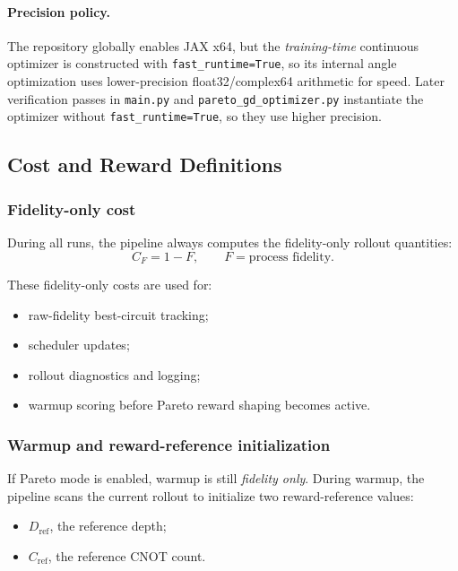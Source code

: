 \documentclass[11pt]{article}
\begin{document}
\paragraph{Precision policy.}
The repository globally enables JAX x64, but the \emph{training-time} continuous optimizer is constructed with \texttt{fast\_runtime=True}, so its internal angle optimization uses lower-precision float32/complex64 arithmetic for speed.
Later verification passes in \texttt{main.py} and \texttt{pareto\_gd\_optimizer.py} instantiate the optimizer without \texttt{fast\_runtime=True}, so they use higher precision.

\subsection{Cost and Reward Definitions}

\subsubsection{Fidelity-only cost}

During all runs, the pipeline always computes the fidelity-only rollout quantities:
\[
C_F = 1-F, \qquad F = \text{process fidelity}.
\]

These fidelity-only costs are used for:
\begin{itemize}[leftmargin=*]
\item raw-fidelity best-circuit tracking;
\item scheduler updates;
\item rollout diagnostics and logging;
\item warmup scoring before Pareto reward shaping becomes active.
\end{itemize}

\subsubsection{Warmup and reward-reference initialization}

If Pareto mode is enabled, warmup is still \emph{fidelity only}. During warmup, the pipeline scans the current rollout to initialize two reward-reference values:
\begin{itemize}[leftmargin=*]
\item $D_{\mathrm{ref}}$, the reference depth;
\item $C_{\mathrm{ref}}$, the reference CNOT count.
\end{itemize}
\end{document}
